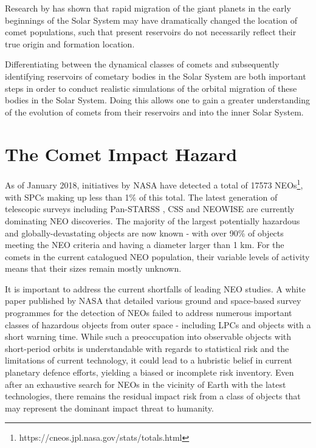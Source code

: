 Research by \cite{2005Natur.435..466G} has shown that rapid migration of the giant planets in the early beginnings of the Solar System may have dramatically changed the location of comet populations, such that present reservoirs do not necessarily reflect their true origin and formation location.

Differentiating between the dynamical classes of comets and subsequently identifying reservoirs of cometary bodies in the Solar System are both important steps in order to conduct realistic simulations of the orbital migration of these bodies in the Solar System. Doing this allows one to gain a greater understanding of the evolution of comets from their reservoirs and into the inner Solar System.

\section{The Comet Impact Hazard}
\label{sec:comet_impact_hazard}


As of January 2018, initiatives by NASA have detected a total of 17573 NEOs\footnote{https://cneos.jpl.nasa.gov/stats/totals.html}, with SPCs making up less than 1\% of this total. The latest generation of telescopic surveys including Pan-STARSS \citep{1538-3873-125-926-357}, CSS \citep{1998BAAS...30.1037L} and NEOWISE \citep{2011ApJ...743..156M} are currently dominating NEO discoveries. The majority of the largest potentially hazardous and globally-devastating objects are now known - with over 90\% of objects meeting the NEO criteria and having a diameter larger than 1 km. For the comets in the current catalogued NEO population, their variable levels of activity means that their sizes remain mostly unknown.

It is important to address the current shortfalls of leading NEO studies. A white paper published by NASA that detailed various ground and space-based survey programmes for the detection of NEOs \citep{united2007near} failed to address numerous important classes of hazardous objects from outer space - including LPCs and objects with a short warning time. While such a preoccupation into observable objects with short-period orbits is understandable with regards to statistical risk and the limitations of current technology, it could lead to a hubristic belief in current planetary defence efforts, yielding a biased or incomplete risk inventory. Even after an exhaustive search for NEOs in the vicinity of Earth with the latest technologies, there remains the residual impact risk from a class of objects that may represent the dominant impact threat to humanity.

